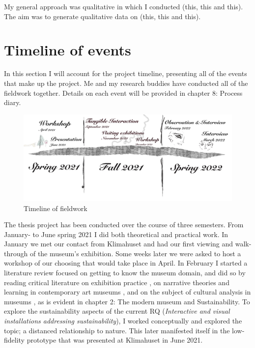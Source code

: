 My general approach was qualitative in which I conducted (this, this and this). The aim was to generate qualitative data on (this, this and this).

\section{Timeline of events}
In this section I will account for the project timeline, presenting all of the events that make up the project. Me and my research buddies have conducted all of the fieldwork together. Details on each event will be provided in chapter 8: Process diary.

\begin{figure}[H]
\includegraphics[width=14cm]{pictures/methodology/timeline.jpg}
\caption{Timeline of fieldwork}
\centering 
\end{figure}

The thesis project has been conducted over the course of three semesters. From January- to June spring 2021 I did both theoretical and practical work. In January we met our contact from Klimahuset and had our first viewing and walk-through of the museum's exhibition. Some weeks later we were asked to host a workshop of our choosing that would take place in April. In February I started a literature review focused on getting to know the museum domain, and did so by reading critical literature on exhibition practice \autocite{Thi_book}, on narrative theories and learning in contemporary art museums \autocite{narrative_sitzia}, and on the subject of cultural analysis in museums \autocite{Miekebal_book}, as is evident in chapter 2: The modern museum and Sustainability. To explore the sustainability aspects of the current RQ (\emph{Interactive and visual installations addressing sustainability}), I worked conceptually and explored the topic; a distanced relationship to nature. This later manifested itself in the low-fidelity prototype that was presented at Klimahuset in June 2021. 

